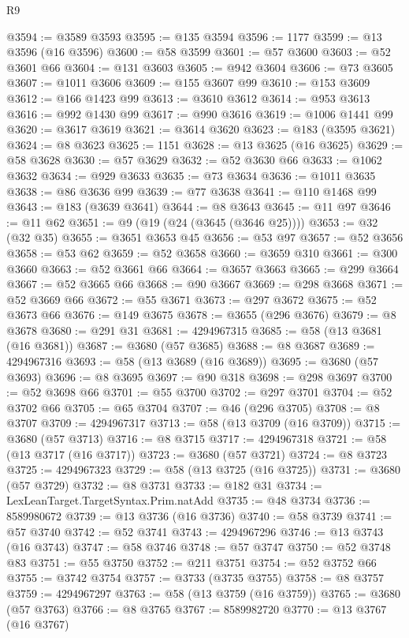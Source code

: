 \begin{lexlean}{R9}
\begin{coremodule}
@3594 := @3589 @3593
@3595 := @135 @3594
@3596 := 1177
@3599 := @13 @3596 (@16 @3596)
@3600 := @58 @3599
@3601 := @57 @3600
@3603 := @52 @3601 @66
@3604 := @131 @3603
@3605 := @942 @3604
@3606 := @73 @3605
@3607 := @1011 @3606
@3609 := @155 @3607 @99
@3610 := @153 @3609
@3612 := @166 @1423 @99
@3613 := @3610 @3612
@3614 := @953 @3613
@3616 := @992 @1430 @99
@3617 := @990 @3616
@3619 := @1006 @1441 @99
@3620 := @3617 @3619
@3621 := @3614 @3620
@3623 := @183 (@3595 @3621)
@3624 := @8 @3623
@3625 := 1151
@3628 := @13 @3625 (@16 @3625)
@3629 := @58 @3628
@3630 := @57 @3629
@3632 := @52 @3630 @66
@3633 := @1062 @3632
@3634 := @929 @3633
@3635 := @73 @3634
@3636 := @1011 @3635
@3638 := @86 @3636 @99
@3639 := @77 @3638
@3641 := @110 @1468 @99
@3643 := @183 (@3639 @3641)
@3644 := @8 @3643
@3645 := @11 @97
@3646 := @11 @62
@3651 := @9 (@19 (@24 (@3645 (@3646 @25))))
@3653 := @32 (@32 @35)
@3655 := @3651 @3653 @45
@3656 := @53 @97
@3657 := @52 @3656
@3658 := @53 @62
@3659 := @52 @3658
@3660 := @3659 @310
@3661 := @300 @3660
@3663 := @52 @3661 @66
@3664 := @3657 @3663
@3665 := @299 @3664
@3667 := @52 @3665 @66
@3668 := @90 @3667
@3669 := @298 @3668
@3671 := @52 @3669 @66
@3672 := @55 @3671
@3673 := @297 @3672
@3675 := @52 @3673 @66
@3676 := @149 @3675
@3678 := @3655 (@296 @3676)
@3679 := @8 @3678
@3680 := @291 @31
@3681 := 4294967315
@3685 := @58 (@13 @3681 (@16 @3681))
@3687 := @3680 (@57 @3685)
@3688 := @8 @3687
@3689 := 4294967316
@3693 := @58 (@13 @3689 (@16 @3689))
@3695 := @3680 (@57 @3693)
@3696 := @8 @3695
@3697 := @90 @318
@3698 := @298 @3697
@3700 := @52 @3698 @66
@3701 := @55 @3700
@3702 := @297 @3701
@3704 := @52 @3702 @66
@3705 := @65 @3704
@3707 := @46 (@296 @3705)
@3708 := @8 @3707
@3709 := 4294967317
@3713 := @58 (@13 @3709 (@16 @3709))
@3715 := @3680 (@57 @3713)
@3716 := @8 @3715
@3717 := 4294967318
@3721 := @58 (@13 @3717 (@16 @3717))
@3723 := @3680 (@57 @3721)
@3724 := @8 @3723
@3725 := 4294967323
@3729 := @58 (@13 @3725 (@16 @3725))
@3731 := @3680 (@57 @3729)
@3732 := @8 @3731
@3733 := @182 @31
@3734 := LexLeanTarget.TargetSyntax.Prim.natAdd
@3735 := @48 @3734
@3736 := 8589980672
@3739 := @13 @3736 (@16 @3736)
@3740 := @58 @3739
@3741 := @57 @3740
@3742 := @52 @3741
@3743 := 4294967296
@3746 := @13 @3743 (@16 @3743)
@3747 := @58 @3746
@3748 := @57 @3747
@3750 := @52 @3748 @83
@3751 := @55 @3750
@3752 := @211 @3751
@3754 := @52 @3752 @66
@3755 := @3742 @3754
@3757 := @3733 (@3735 @3755)
@3758 := @8 @3757
@3759 := 4294967297
@3763 := @58 (@13 @3759 (@16 @3759))
@3765 := @3680 (@57 @3763)
@3766 := @8 @3765
@3767 := 8589982720
@3770 := @13 @3767 (@16 @3767)

\end{coremodule}
\end{lexlean}
